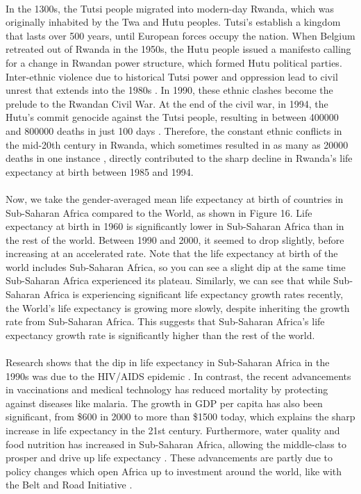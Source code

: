 \documentclass[15pt]{article}
\begin{document}
\\
In the 1300s, the Tutsi people migrated into modern-day Rwanda, which was originally inhabited by the Twa and Hutu peoples. Tutsi's establish a kingdom that lasts over 500 years, until European forces occupy the nation. When Belgium retreated out of Rwanda in the 1950s, the Hutu people issued a manifesto calling for a change in Rwandan power structure, which formed Hutu political parties. Inter-ethnic violence due to historical Tutsi power and oppression lead to civil unrest that extends into the 1980s \cite{10}. In 1990, these ethnic clashes become the prelude to the Rwandan Civil War. At the end of the civil war, in 1994, the Hutu's commit genocide against the Tutsi people, resulting in between 400000 and 800000 deaths in just 100 days \cite{10}. Therefore, the constant ethnic conflicts in the mid-20th century in Rwanda, which sometimes resulted in as many as 20000 deaths in one instance \cite{10}, directly contributed to the sharp decline in Rwanda's life expectancy at birth between 1985 and 1994. \\
\\
Now, we take the gender-averaged mean life expectancy at birth of countries in Sub-Saharan Africa compared to the World, as shown in Figure 16. Life expectancy at birth in 1960 is significantly lower in Sub-Saharan Africa than in the rest of the world. Between 1990 and 2000, it seemed to drop slightly, before increasing at an accelerated rate. Note that the life expectancy at birth of the world includes Sub-Saharan Africa, so you can see a slight dip at the same time Sub-Saharan Africa experienced its plateau. Similarly, we can see that while Sub-Saharan Africa is experiencing significant life expectancy growth rates recently, the World's life expectancy is growing more slowly, despite inheriting the growth rate from Sub-Saharan Africa. This suggests that Sub-Saharan Africa's life expectancy growth rate is significantly higher than the rest of the world.\\
\\
Research shows that the dip in life expectancy in Sub-Saharan Africa in the 1990s was due to the HIV/AIDS epidemic \cite{11}. In contrast, the recent advancements in vaccinations and medical technology has reduced mortality by protecting against diseases like malaria. The growth in GDP per capita has also been significant, from \$600 in 2000 to more than \$1500 today, which explains the sharp increase in life expectancy in the 21st century. Furthermore, water quality and food nutrition has increased in Sub-Saharan Africa, allowing the middle-class to prosper and drive up life expectancy \cite{12}. These advancements are partly due to policy changes which open Africa up to investment around the world, like with the Belt and Road Initiative \cite{13}. 
\end{document}
